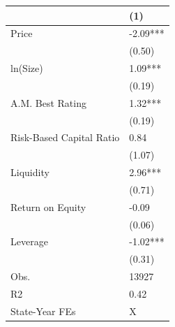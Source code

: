 \begin{tabular}{ll}
\hline
& (1) \\ \hline
Price                    & -2.09*** \\
& (0.50)   \\
ln(Size)                 & 1.09***  \\
& (0.19)   \\
A.M. Best Rating         & 1.32***  \\
& (0.19)   \\
Risk-Based Capital Ratio & 0.84     \\
& (1.07)   \\
Liquidity                & 2.96***  \\
& (0.71)   \\
Return on Equity         & -0.09    \\
& (0.06)   \\
Leverage                 & -1.02*** \\
& (0.31)   \\
Obs.                     & 13927    \\
R2                       & 0.42     \\
State-Year FEs           & X        \\
\hline
\end{tabular}
